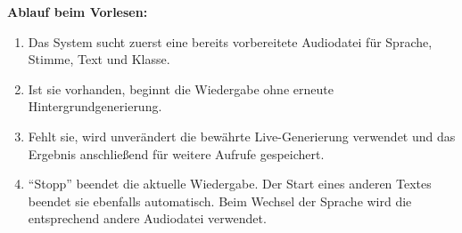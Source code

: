 \documentclass[12pt,a4paper]{article}
\begin{document}
\textbf{Ablauf beim Vorlesen:}
\begin{enumerate}
  \item Das System sucht zuerst eine bereits vorbereitete Audiodatei für Sprache, Stimme, Text und Klasse.
  \item Ist sie vorhanden, beginnt die Wiedergabe ohne erneute Hintergrundgenerierung.
  \item Fehlt sie, wird unverändert die bewährte Live-Generierung verwendet und das Ergebnis anschließend für weitere Aufrufe gespeichert.
  \item \enquote{Stopp} beendet die aktuelle Wiedergabe. Der Start eines anderen Textes beendet sie ebenfalls automatisch. Beim Wechsel der Sprache wird die entsprechend andere Audiodatei verwendet.
\end{enumerate}
\end{document}
